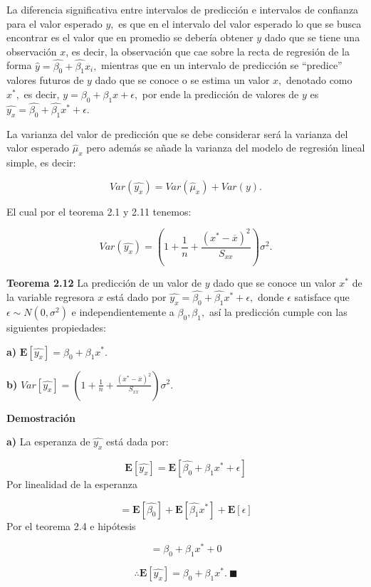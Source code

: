 \documentclass[a4paper,oneside,openany]{book}
\begin{document}
La diferencia significativa entre intervalos de predicción e intervalos
de confianza para el valor esperado \(y,\) es que en el intervalo del
valor esperado lo que se busca encontrar es el valor que en promedio se
debería obtener \(y\) dado que se tiene una observación \(x\), es decir,
la observación que cae sobre la recta de regresión de la forma
\(\hat{y}=\hat{\beta_{0}}+\hat{\beta_{1}}x_{i},\) mientras que en un
intervalo de predicción se ``predice'' valores futuros de \(y\) dado que
se conoce o se estima un valor \(x,\) denotado como \(x^*,\) es decir,
\(y=\beta_{0}+\beta_{1}x+\epsilon,\) por ende la predicción de valores
de \(y\) es \(\hat{y_{x}}=\hat{\beta_{0}}+\hat{\beta_{1}}x^*+\epsilon\).

La varianza del valor de predicción que se debe considerar será la
varianza del valor esperado \(\hat{\mu}_{x}\) pero además se añade la
varianza del modelo de regresión lineal simple, es decir:

\[Var(\hat{y_{x}})=Var(\hat{\mu}_x)+Var(y).\]

El cual por el teorema 2.1 y 2.11 tenemos:

\[Var(\hat{y_{x}})=\left( 1+ \frac{1}{n}+\frac{(x^*-\overline{x})^2}{S_{xx}}\right)\sigma^2.\]

\textbf{Teorema 2.12} La predicción de un valor de \(y\) dado que se
conoce un valor \(x^*\) de la variable regresora \(x\) está dado por
\(\hat{y_{x}}=\hat{\beta_{0}}+\hat{\beta_{1}}x^*+\epsilon,\) donde
\(\epsilon\) satisface que \(\epsilon\sim N(0,\sigma^2)\) e
independientemente a \(\beta_{0},\beta_{1},\) así la predicción cumple
con las siguientes propiedades:

\textbf{a)}
\(\mathbf{E}\left[\hat{y_{x}}\right]=\beta_{0}+\beta_{1}x^*.\)

\textbf{b)}
\(Var\left[\hat{y_{x}}\right]=\left(1+ \frac{1}{n}+\frac{(x^*-\overline{x})^2}{S_{xx}}\right)\sigma^2.\)

\textbf{Demostración}

\textbf{a)} La esperanza de \(\hat{y_{x}}\) está dada por:

\[\mathbf{E}\left[\hat{y_{x}}\right]=\mathbf {E}\left[\hat{\beta_{0}}+\hat{\beta_{1}}x^*+ \epsilon\right]\]
Por linealidad de la esperanza

\[=\mathbf{E}\left[\hat{\beta_{0}}\right]+\mathbf{E}\left[\hat{\beta_{1}}x^*\right]+ \mathbf{E}\left[\epsilon\right]\]
Por el teorema 2.4 e hipótesis

\[=\beta_{0}+\beta_{1}x^*+0\]

\[\therefore \mathbf{E}\left[\hat{y_{x}}\right]=\beta_{0}+\beta_{1}x^*. \ \blacksquare\]
\end{document}
